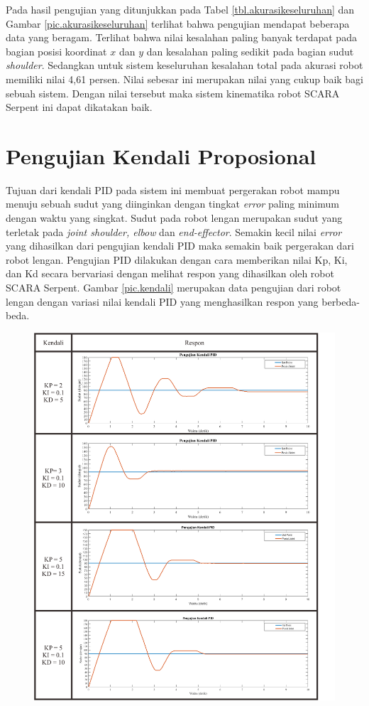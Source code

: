 Pada hasil pengujian yang ditunjukkan pada Tabel \ref{tbl.akurasikeseluruhan} dan Gambar \ref{pic.akurasikeseluruhan} terlihat bahwa pengujian mendapat beberapa data yang beragam. Terlihat bahwa nilai kesalahan paling banyak terdapat pada bagian posisi koordinat $x$ dan $y$ dan kesalahan paling sedikit pada bagian sudut \textit{shoulder}. Sedangkan untuk sistem keseluruhan kesalahan total pada akurasi robot memiliki nilai 4,61 persen. Nilai sebesar ini merupakan nilai yang cukup baik bagi sebuah sistem. Dengan nilai tersebut maka sistem kinematika robot SCARA Serpent ini dapat dikatakan baik. 


\section{Pengujian Kendali Proposional}
Tujuan dari kendali PID pada sistem ini membuat pergerakan robot mampu menuju sebuah sudut yang diinginkan dengan tingkat \textit{error} paling minimum dengan waktu yang singkat. Sudut pada robot lengan merupakan sudut yang terletak pada \textit{joint shoulder, elbow} dan \textit{end-effector}. Semakin kecil nilai \textit{error} yang dihasilkan dari pengujian kendali PID maka semakin baik pergerakan dari robot lengan. Pengujian PID dilakukan dengan cara memberikan nilai Kp, Ki, dan Kd secara bervariasi dengan melihat respon yang dihasilkan oleh robot SCARA Serpent. Gambar \ref{pic.kendali} merupakan data pengujian dari robot lengan dengan variasi nilai kendali PID yang menghasilkan respon yang berbeda-beda.


\begin{figure}[H]
	\centering
	\includegraphics[width=13cm]{gambar/kendali1.png}
\end{figure}

